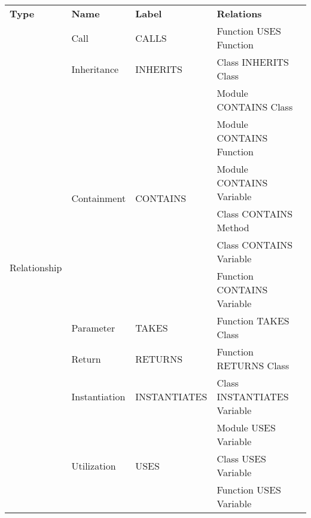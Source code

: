 \begin{tabular}{llll}
\hline
\hline
\textbf{Type} & \textbf{Name} & \textbf{Label} & \textbf{Relations} \\
\cline{1-1}\cline{2-2}\cline{3-3}\cline{4-4}
\multirow{14}{*}{Relationship} & Call & CALLS & Function USES Function \\
\cline{2-2}\cline{3-3}\cline{4-4}
 & Inheritance & INHERITS & Class INHERITS Class \\
\cline{2-2}\cline{3-3}\cline{4-4}
 & \multirow{6}{*}{Containment} & \multirow{6}{*}{CONTAINS} & Module CONTAINS Class \\
\cline{4-4}
 &  &  & Module CONTAINS Function \\
\cline{4-4}
 &  &  & Module CONTAINS Variable \\
\cline{4-4}
 &  &  & Class CONTAINS Method \\
\cline{4-4}
 &  &  & Class CONTAINS Variable \\
\cline{4-4}
 &  &  & Function CONTAINS Variable \\
\cline{2-2}\cline{3-3}\cline{4-4}
 & Parameter & TAKES & Function TAKES Class \\
\cline{2-2}\cline{3-3}\cline{4-4}
 & Return & RETURNS & Function RETURNS Class \\
\cline{2-2}\cline{3-3}\cline{4-4}
 & Instantiation & INSTANTIATES & Class INSTANTIATES Variable \\
\cline{2-2}\cline{3-3}\cline{4-4}
 & \multirow{3}{*}{Utilization} & \multirow{3}{*}{USES} & Module USES Variable \\
\cline{4-4}
 &  &  & Class USES Variable \\
\cline{4-4}
 &  &  & Function USES Variable \\
\cline{1-1}\cline{2-2}\cline{3-3}\cline{4-4}
\hline
\end{tabular}

